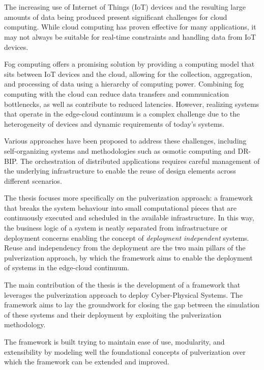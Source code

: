 \chapter{\conclusionsname}
\label{chap:conclusions}

The increasing use of Internet of Things (IoT) devices and the resulting large amounts of data being produced present significant challenges for
cloud computing. While cloud computing has proven effective for many applications, it may not always be suitable for real-time constraints and
handling data from IoT devices.

Fog computing offers a promising solution by providing a computing model that sits between IoT devices and the cloud,
allowing for the collection, aggregation, and processing of data using a hierarchy of computing power. Combining fog computing with the cloud can
reduce data transfers and communication bottlenecks, as well as contribute to reduced latencies. However, realizing systems that operate in the
edge-cloud continuum is a complex challenge due to the heterogeneity of devices and dynamic requirements of today's systems.

Various approaches have been proposed to address these challenges, including self-organizing systems and methodologies such as osmotic computing and
DR-BIP. The orchestration of distributed applications requires careful management of the underlying infrastructure to enable the reuse of design
elements across different scenarios.

The thesis focuses more specifically on the pulverization approach: a framework that breaks the system behaviour into small computational pieces that
are continuously executed and scheduled in the available infrastructure.
In this way, the business logic of a system is neatly separated from infrastructure or deployment concerns enabling the concept of
\emph{deployment independent} systems.
Reuse and independency from the deployment are the two main pillars of the pulverization approach, by which the framework aims to enable the
deployment of systems in the edge-cloud continuum.

The main contribution of the thesis is the development of a framework that leverages the pulverization approach to deploy Cyber-Physical Systems.
The framework aims to lay the groundwork for closing the gap between the simulation of these systems and their deployment by exploiting the
pulverization methodology.

The framework is built trying to maintain ease of use, modularity, and extensibility by modeling well the foundational concepts of pulverization over
which the framework can be extended and improved.

